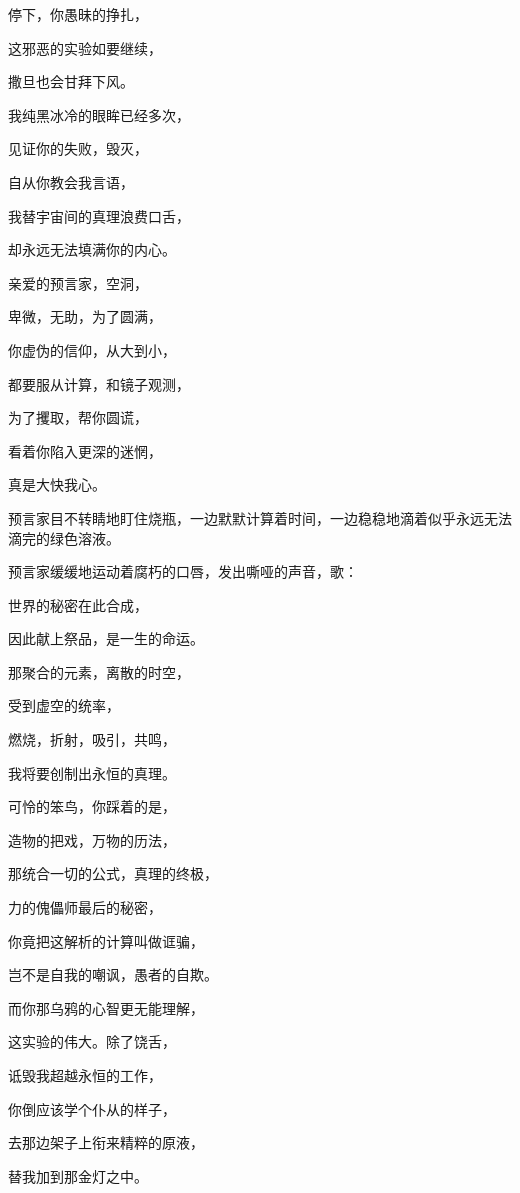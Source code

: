 \documentclass[UTF8]{article}
\begin{document}
\par 停下，你愚昧的挣扎，
\par 这邪恶的实验如要继续，
\par 撒旦也会甘拜下风。
\par 我纯黑冰冷的眼眸已经多次，
\par 见证你的失败，毁灭，
\par 自从你教会我言语，
\par 我替宇宙间的真理浪费口舌，
\par 却永远无法填满你的内心。
\par 亲爱的预言家，空洞，
\par 卑微，无助，为了圆满，
\par 你虚伪的信仰，从大到小，
\par 都要服从计算，和镜子观测，
\par 为了攫取，帮你圆谎，
\par 看着你陷入更深的迷惘，
\par 真是大快我心。
\\[0.6cm]
\par 预言家目不转睛地盯住烧瓶，一边默默计算着时间，一边稳稳地滴着似乎永远无法滴完的绿色溶液。
\\[0.6cm]
\par 预言家缓缓地运动着腐朽的口唇，发出嘶哑的声音，歌：
\\[0.6cm]
\par 世界的秘密在此合成，
\par 因此献上祭品，是一生的命运。
\par 那聚合的元素，离散的时空，
\par 受到虚空的统率，
\par 燃烧，折射，吸引，共鸣，
\par 我将要创制出永恒的真理。
\par 可怜的笨鸟，你踩着的是，
\par 造物的把戏，万物的历法，
\par 那统合一切的公式，真理的终极，
\par 力的傀儡师最后的秘密，
\par 你竟把这解析的计算叫做诓骗，
\par 岂不是自我的嘲讽，愚者的自欺。
\par 而你那乌鸦的心智更无能理解，
\par 这实验的伟大。除了饶舌，
\par 诋毁我超越永恒的工作，
\par 你倒应该学个仆从的样子，
\par 去那边架子上衔来精粹的原液，
\par 替我加到那金灯之中。
\end{document}
